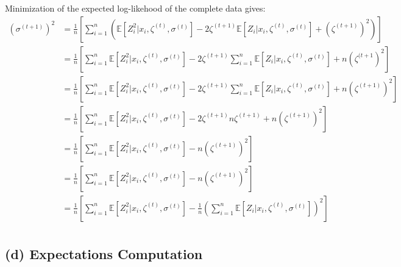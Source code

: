 \documentclass{article}
\begin{document}
\noindent Minimization of the expected log-likehood of the complete data gives:
\begin{align*}
    (\sigma^{(t+1)})^2 &= \frac{1}{n}  \left [  
        \sum_{i=1}^n \left ( \mathbb{E}[Z_i^2|x_i, \zeta^{(t)}, \sigma^{(t)}] 
        - 2 \zeta^{(t+1)} \mathbb{E}[Z_i|x_i, \zeta^{(t)}, \sigma^{(t)}] + (\zeta^{(t+1)})^2    
        \right ) \right ] \\
    &=   \frac{1}{n}  \left [  
        \sum_{i=1}^n  \mathbb{E}[Z_i^2|x_i, \zeta^{(t)}, \sigma^{(t)}] 
        - 2 \zeta^{(t+1)}\sum_{i=1}^n \mathbb{E}[Z_i|x_i, \zeta^{(t)}, \sigma^{(t)}] + n(\zeta^{(t+1})^2    
         \right ] \\
    &= \frac{1}{n} \left [  
        \sum_{i=1}^n  \mathbb{E}[Z_i^2|x_i, \zeta^{(t)}, \sigma^{(t)}] 
        - 2 \zeta^{(t+1)}\sum_{i=1}^n \mathbb{E}[Z_i|x_i, \zeta^{(t)}, \sigma^{(t)}] + n(\zeta^{(t+1)})^2    
         \right ] \\
    &= \frac{1}{n} \left [  
        \sum_{i=1}^n  \mathbb{E}[Z_i^2|x_i, \zeta^{(t)}, \sigma^{(t)}] 
        - 2 \zeta^{(t+1)}n \zeta^{(t+1)}+ n(\zeta^{(t+1)})^2    
         \right ] \\
     &= \frac{1}{n} \left [  
            \sum_{i=1}^n  \mathbb{E}[Z_i^2|x_i, \zeta^{(t)}, \sigma^{(t)}] 
            - n(\zeta^{(t+1)})^2    
             \right ] \\
     &= \frac{1}{n} \left [  
                \sum_{i=1}^n  \mathbb{E}[Z_i^2|x_i, \zeta^{(t)}, \sigma^{(t)}] 
                - n(\zeta^{(t+1)})^2    
                 \right ] \\
     &= \frac{1}{n} \left [  
                    \sum_{i=1}^n  \mathbb{E}[Z_i^2|x_i, \zeta^{(t)}, \sigma^{(t)}] 
                    - \frac{1}{n}
                    \left (\sum_{i=1}^n \mathbb{E}[Z_i |x_i, \zeta^{(t)}, \sigma^{(t)}]
                    \right )^2    
                     \right ] \\
\end{align*}

\subsection*{(d) Expectations Computation}
\end{document}
